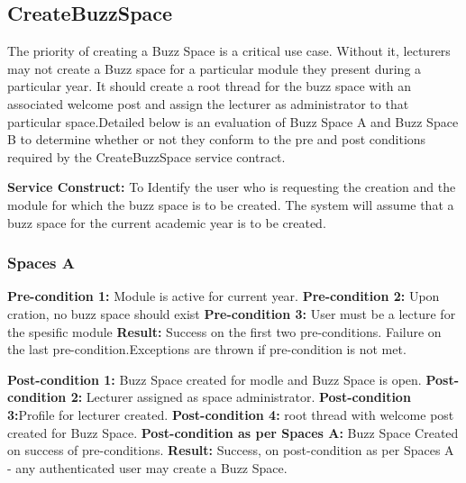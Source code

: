 
\subsection{CreateBuzzSpace}
The priority of creating a Buzz Space is a critical use case. Without it, lecturers may not create a Buzz space for a particular module they present during a particular year. It should create a root thread for the buzz space with an associated welcome post and assign the lecturer as administrator to that particular space.Detailed below is an evaluation of Buzz Space A and Buzz Space B to determine whether or not they conform to the pre and post conditions required by the CreateBuzzSpace service contract.  

\textbf{Service Construct:}  To Identify the user who is requesting the creation and the module for which the buzz space is to be 		                                              created. The system will assume that a buzz space for the current academic year is to be created.   	 
  				   \newline

\subsubsection{Spaces A}
\textbf{Pre-condition 1:}  Module is active for current year.  \newline
\textbf{Pre-condition 2:}  Upon cration, no buzz space should exist \newline
\textbf{Pre-condition 3:}  User must be a lecture for the spesific module \newline
\textbf{Result:} Success on the first two  pre-conditions. Failure on the last pre-condition.Exceptions are thrown if pre-condition is not met.\newline

\textbf{Post-condition 1:} Buzz Space created for modle and Buzz Space is open.\newline
\textbf{Post-condition 2:} Lecturer assigned as space administrator.\newline
\textbf{Post-condition 3:}Profile for lecturer created.\newline
\textbf{Post-condition 4:} root thread with welcome post created for Buzz Space.\newline
\textbf{Post-condition as per Spaces A:} Buzz Space Created on success of pre-conditions. \newline
\textbf{Result:} Success, on post-condition as per Spaces A -  any authenticated user may create a Buzz Space.\newline
  
